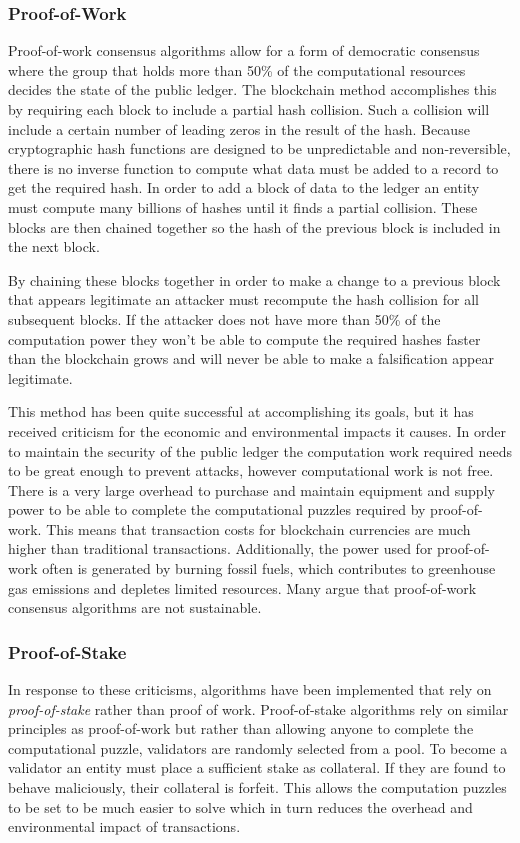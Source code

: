 \documentclass[runningheads]{llncs}
\begin{document}
\subsubsection{Proof-of-Work}
Proof-of-work consensus algorithms allow for a form of democratic consensus where the group that holds more than 50\% of the computational resources decides the state of the public ledger. The blockchain method accomplishes this by requiring each block to include a partial hash collision. Such a collision will include a certain number of leading zeros in the result of the hash. Because cryptographic hash functions are designed to be unpredictable and non-reversible, there is no inverse function to compute what data must be added to a record to get the required hash. In order to add a block of data to the ledger an entity must compute many billions of hashes until it finds a partial collision. These blocks are then chained together so the hash of the previous block is included in the next block. 

By chaining these blocks together in order to make a change to a previous block that appears legitimate an attacker must recompute the hash collision for all subsequent blocks. If the attacker does not have more than 50\% of the computation power they won't be able to compute the required hashes faster than the blockchain grows and will never be able to make a falsification appear legitimate.

This method has been quite successful at accomplishing its goals, but it has received criticism for the economic and environmental impacts it causes. In order to maintain the security of the public ledger the computation work required needs to be great enough to prevent attacks, however computational work is not free. There is a very large overhead to purchase and maintain equipment and supply power to be able to complete the computational puzzles required by proof-of-work. This means that transaction costs for blockchain currencies are much higher than traditional transactions. Additionally, the power used for proof-of-work often is generated by burning fossil fuels, which contributes to greenhouse gas emissions and depletes limited resources. Many argue that proof-of-work consensus algorithms are not sustainable. 

\subsubsection{Proof-of-Stake}
In response to these criticisms, algorithms have been implemented that rely on \emph{proof-of-stake} rather than proof of work. Proof-of-stake algorithms rely on similar principles as proof-of-work but rather than allowing anyone to complete the computational puzzle, validators are randomly selected from a pool. To become a validator an entity must place a sufficient stake as collateral. If they are found to behave maliciously, their collateral is forfeit. This allows the computation puzzles to be set to be much easier to solve which in turn reduces the overhead and environmental impact of transactions.
\end{document}
